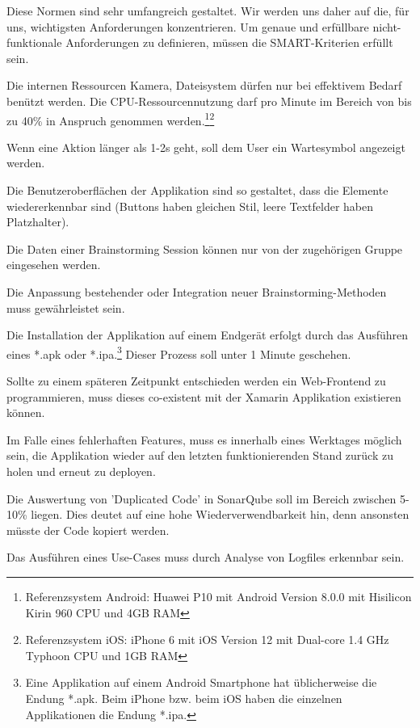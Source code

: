 Diese Normen sind sehr umfangreich gestaltet. Wir werden uns daher auf die, für uns, wichtigsten Anforderungen konzentrieren. Um genaue und erfüllbare nicht-funktionale Anforderungen zu definieren, müssen die SMART-Kriterien \cite{SMART} erfüllt sein. 

\begin{description}[leftmargin=!,labelwidth=\widthof{\bfseries Wiederverwendbarkeit}]
	\item[Ressourcennutzung] Die internen Ressourcen Kamera, Dateisystem dürfen nur bei effektivem Bedarf benützt werden. Die CPU-Ressourcen\-nutzung darf pro Minute im Bereich von bis zu 40\% in Anspruch genommen werden.\footnote{Referenzsystem Android: Huawei P10 mit Android Version 8.0.0 mit Hisilicon Kirin 960 CPU und 4GB RAM}\footnote{Referenzsystem iOS: iPhone 6 mit iOS Version 12 mit Dual-core 1.4 GHz Typhoon CPU und 1GB RAM}
	
	\item[Bedienbarkeit] Wenn eine Aktion länger als 1-2s geht, soll dem User ein Wartesymbol angezeigt werden. 
	
	\item[Ästhetik] Die Benutzeroberflächen der Applikation sind so gestaltet, dass die Elemente wiedererkennbar sind (Buttons haben gleichen Stil, leere Textfelder haben Platzhalter). 
	
	\item[Vertraulichkeit] Die Daten einer Brainstorming Session können nur von der zugehörigen Gruppe eingesehen werden. 
	
	\item[Anpassbarkeit] Die Anpassung bestehender oder Integration neuer Brain\-storming-Methoden muss gewährleistet sein.
	
	\item[Installierbarkeit] Die Installation der Applikation auf einem Endgerät erfolgt durch das Ausführen eines *.apk oder *.ipa.\footnote{Eine Applikation auf einem Android Smartphone hat üblicherweise die Endung *.apk. Beim iPhone bzw. beim iOS haben die einzelnen Applikationen die Endung *.ipa.} Dieser Prozess soll unter 1 Minute geschehen.
	
	\item[Co-Existenz] Sollte zu einem späteren Zeitpunkt entschieden werden ein Web-Frontend zu programmieren, muss dieses co-existent mit der Xamarin Applikation existieren können.
	
	\item[Wiederherstellbarkeit] Im Falle eines fehlerhaften Features, muss es innerhalb eines Werktages möglich sein, die Applikation wieder auf den letzten funktionierenden Stand zurück zu holen und erneut zu deployen.	
	
	\item[Wiederverwendbarkeit] Die Auswertung von 'Duplicated Code' in SonarQube soll im Bereich zwischen 5-10\% \cite{Duplicated_Code} liegen. Dies deutet auf eine hohe Wiederverwendbarkeit hin, denn ansonsten müsste der Code kopiert werden. 
	
	\item[Analysierbarkeit] Das Ausführen eines Use-Cases muss durch Analyse von Logfiles erkennbar sein.
\end{description}
